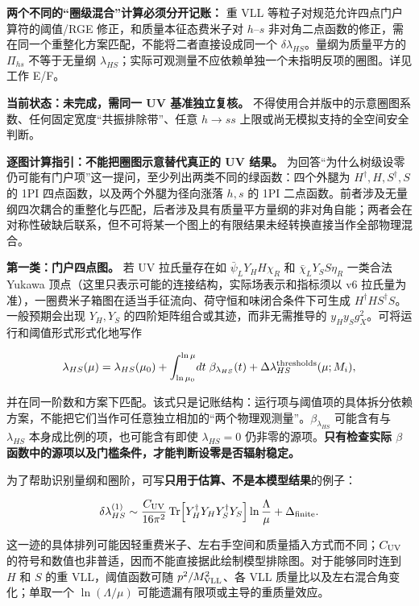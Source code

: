 \documentclass[
  chinese,
  UTF8]{ctexart}
\begin{document}
\textbf{两个不同的``圈级混合''计算必须分开记账：} 重 VLL
等粒子对规范允许四点门户算符的阈值/RGE 修正，和质量本征态费米子对
\(h\)--\(s\)
非对角二点函数的修正，需在同一个重整化方案匹配，不能将二者直接设成同一个
\(\delta\lambda_{HS}\)。量纲为质量平方的 \(\Pi_{hs}\) 不等于无量纲
\(\lambda_{HS}\)；实际可观测量不应依赖单独一个未指明反项的圈图。详见工作
E/F。

\textbf{当前状态：未完成，需同一 UV 基准独立复核。}
不得使用合并版中的示意圈图系数、任何固定宽度``共振排除带''、任意
\(h\to ss\) 上限或尚无模拟支持的全空间安全判断。

\textbf{逐图计算指引：不能把圈图示意替代真正的 UV 结果。}
为回答``为什么树级设零仍可能有门户项''这一提问，至少列出两类不同的绿函数：四个外腿为
\(H^\dagger,H,S^\dagger,S\) 的 1PI 四点函数，以及两个外腿为径向涨落
\(h,s\) 的 1PI
二点函数。前者涉及无量纲四次耦合的重整化与匹配，后者涉及具有质量平方量纲的非对角自能；两者会在对称性破缺后联系，但不可将某一个图上的有限结果未经转换直接当作全部物理混合。

\textbf{第一类：门户四点图。} 若 UV 拉氏量存在如
\(\bar\psi_L Y_H H\chi_R\) 和 \(\bar\chi_LY_S S\eta_R\) 一类合法 Yukawa
顶点（这里只表示可能的连接结构，实际场表示和指标须以 v6
拉氏量为准），一圈费米子箱图在适当手征流向、荷守恒和味闭合条件下可生成
\(H^\dagger H S^\dagger S\)。一般预期会出现 \(Y_H,Y_S\)
的四阶矩阵组合或其迹，而非无需推导的
\(y_Hy_Sg_X^2\)。可将运行和阈值形式形式化地写作

\[
\lambda_{HS}(\mu)=\lambda_{HS}(\mu_0)
+\int_{\ln\mu_0}^{\ln\mu}\!dt\;\beta_{\lambda_{HS}}(t)
+\Delta\lambda_{HS}^{\rm thresholds}(\mu;M_i),
\]

并在同一阶数和方案下匹配。该式只是记账结构：运行项与阈值项的具体拆分依赖方案，不能把它们当作可任意独立相加的``两个物理观测量''。\(\beta_{\lambda_{HS}}\)
可能含有与 \(\lambda_{HS}\) 本身成比例的项，也可能含有即使
\(\lambda_{HS}=0\) 仍非零的源项。\textbf{只有检查实际 \(\beta\)
函数中的源项以及门槛条件，才能判断设零是否辐射稳定。}

为了帮助识别量纲和圈阶，可写\textbf{只用于估算、不是本模型结果}的例子：

\[
\delta\lambda_{HS}^{(1)}\sim
\frac{C_{\rm UV}}{16\pi^2}\,
\mathrm{Tr}\!\left[ Y_H^\dagger Y_H Y_S^\dagger Y_S\right]
\ln\frac{\Lambda}{\mu}
+\Delta_{\rm finite}.
\]

这一迹的具体排列可能因轻重费米子、左右手空间和质量插入方式而不同；\(C_{\rm UV}\)
的符号和数值也非普适，因而不能直接据此绘制模型排除图。对于能够同时连到
\(H\) 和 \(S\) 的重 VLL，阈值函数可随 \(p^2/M_{\rm VLL}^2\)、各 VLL
质量比以及左右混合角变化；单取一个 \(\ln(\Lambda/\mu)\)
可能遗漏有限项或主导的重质量效应。
\end{document}
